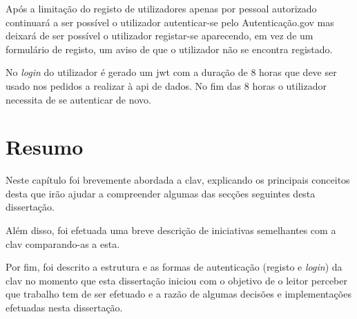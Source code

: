Após a limitação do registo de utilizadores apenas por pessoal autorizado continuará a ser possível o utilizador autenticar-se pelo Autenticação.gov mas deixará de ser possível o utilizador registar-se aparecendo, em vez de um formulário de registo, um aviso de que o utilizador não se encontra registado.

No \textit{login} do utilizador é gerado um \acrshort{jwt} com a duração de 8 horas que deve ser usado nos pedidos a realizar à \acrshort{api} de dados. No fim das 8 horas o utilizador necessita de se autenticar de novo.

\section{Resumo}

Neste capítulo foi brevemente abordada a \acrshort{clav}, explicando os principais conceitos desta que irão ajudar a compreender algumas das secções seguintes desta dissertação.

Além disso, foi efetuada uma breve descrição de iniciativas semelhantes com a \acrshort{clav} comparando-as a esta.

Por fim, foi descrito a estrutura e as formas de autenticação (registo e \textit{login}) da \acrshort{clav} no momento que esta dissertação iniciou com o objetivo de o leitor perceber que trabalho tem de ser efetuado e a razão de algumas decisões e implementações efetuadas nesta dissertação.
